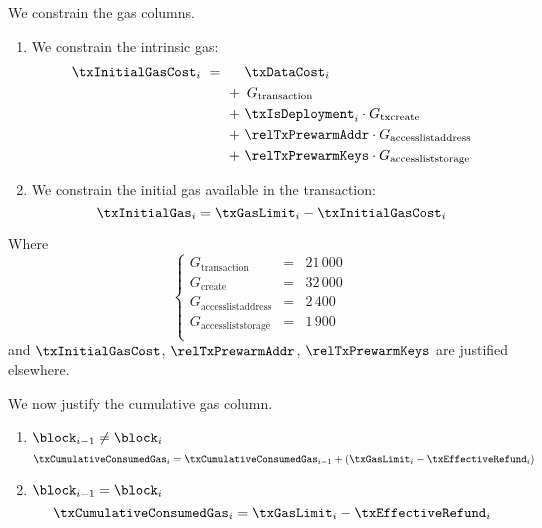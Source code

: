 \begin{center}
\end{center}
We constrain the gas columns.
\begin{enumerate}
	\item We constrain the intrinsic gas:
	\[
		\begin{array}{lcl}
			\txInitialGasCost_{i} & \!\!\! = \!\!\! & \phantom{+} ~ \txDataCost_{i}  \vspace{1mm} \\
			& & + ~ \, G_{\text{transaction}}                                        \vspace{1mm} \\
			& & + ~ \txIsDeployment_{i} \cdot G_{\text{txcreate}}                           \vspace{1mm} \\
			& & + ~ \relTxPrewarmAddr \cdot G_{\text{accesslistaddress}}             \vspace{1mm} \\
			& & + ~ \relTxPrewarmKeys \cdot G_{\text{accessliststorage}}                          \\
		\end{array} 
	\]
	\item We constrain the initial gas available in the transaction:
	\[
		\txInitialGas_{i}
		=
		\txGasLimit_{i} - \txInitialGasCost_{i}
	\]
\end{enumerate}
Where
\[
\left\{
\begin{array}{lcr}
	G_\text{transaction} 		& \!\!\! = \!\!\! & 21\,000 \\
	G_\text{create} 			& \!\!\! = \!\!\! & 32\,000 \\
	G_\text{accesslistaddress}	& \!\!\! = \!\!\! & 2\,400 \\
	G_\text{accessliststorage}	& \!\!\! = \!\!\! & 1\,900 \\
\end{array}
\right.
\]
and
$\txInitialGasCost$,
$\relTxPrewarmAddr$,
$\relTxPrewarmKeys$
are justified elsewhere.

We now justify the cumulative gas column.
\begin{enumerate}
	\item \If $\block_{i - 1} \neq \block_{i}$ \Then
	\[
	\txCumulativeConsumedGas_{i}
	=
	\txCumulativeConsumedGas_{i - 1}
	+
	(\txGasLimit_{i} - \txEffectiveRefund_{i})
	\]
	\item \If $\block_{i - 1} = \block_{i}$ \Then
	\[
	\txCumulativeConsumedGas_{i}
	=
	\txGasLimit_{i} - \txEffectiveRefund_{i}
	\]
\end{enumerate}
